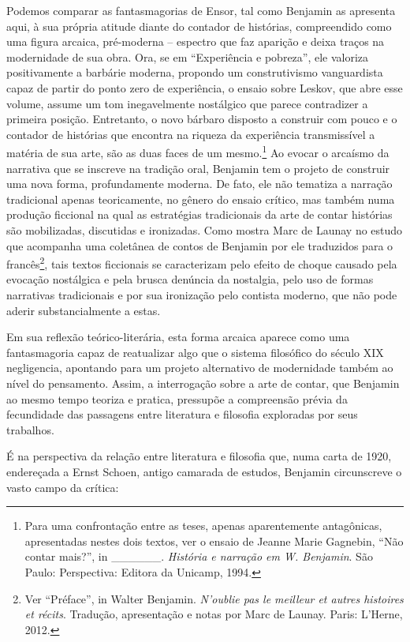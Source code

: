 Podemos comparar as fantasmagorias de Ensor, tal como Benjamin as
apresenta aqui, à sua própria atitude diante do contador de histórias,
compreendido como uma figura arcaica, pré-moderna -- espectro que faz
aparição e deixa traços na modernidade de sua obra. Ora, se em
``Experiência e pobreza'', ele valoriza positivamente a barbárie
moderna, propondo um construtivismo vanguardista capaz de partir do
ponto zero de experiência, o ensaio sobre Leskov, que abre esse volume,
assume um tom inegavelmente nostálgico que parece contradizer a primeira
posição. Entretanto, o novo bárbaro disposto a construir com pouco e o
contador de histórias que encontra na riqueza da experiência
transmissível a matéria de sua arte, são as duas faces de um
mesmo.\footnote{Para uma confrontação entre as teses, apenas
  aparentemente antagônicas, apresentadas nestes dois textos, ver o
  ensaio de Jeanne Marie Gagnebin, ``Não contar mais?'', in
  \_\_\_\_\_\_. \emph{História e narração em W. Benjamin}. São Paulo:
  Perspectiva: Editora da Unicamp, 1994.} Ao evocar o arcaísmo da
narrativa que se inscreve na tradição oral, Benjamin tem o projeto de
construir uma nova forma, profundamente moderna. De fato, ele não
tematiza a narração tradicional apenas teoricamente, no gênero do ensaio
crítico, mas também numa produção ficcional na qual as estratégias
tradicionais da arte de contar histórias são mobilizadas, discutidas e
ironizadas. Como mostra Marc de Launay no estudo que acompanha uma
coletânea de contos de Benjamin por ele traduzidos para o
francês\footnote{Ver ``Préface'', in Walter Benjamin. \emph{N'oublie pas
  le meilleur et autres histoires et récits}. Tradução, apresentação e
  notas por Marc de Launay. Paris: L'Herne, 2012.}, tais textos
ficcionais se caracterizam pelo efeito de choque causado pela evocação
nostálgica e pela brusca denúncia da nostalgia, pelo uso de formas
narrativas tradicionais e por sua ironização pelo contista moderno, que
não pode aderir substancialmente a estas.

Em sua reflexão teórico-literária, esta forma arcaica aparece como uma
fantasmagoria capaz de reatualizar algo que o sistema filosófico do
século XIX negligencia, apontando para um projeto alternativo de
modernidade também ao nível do pensamento. Assim, a interrogação sobre a
arte de contar, que Benjamin ao mesmo tempo teoriza e pratica, pressupõe
a compreensão prévia da fecundidade das passagens entre literatura e
filosofia exploradas por seus trabalhos.

É na perspectiva da relação entre literatura e filosofia que, numa carta
de 1920, endereçada a Ernst Schoen, antigo camarada de estudos, Benjamin
circunscreve o vasto campo da crítica:

